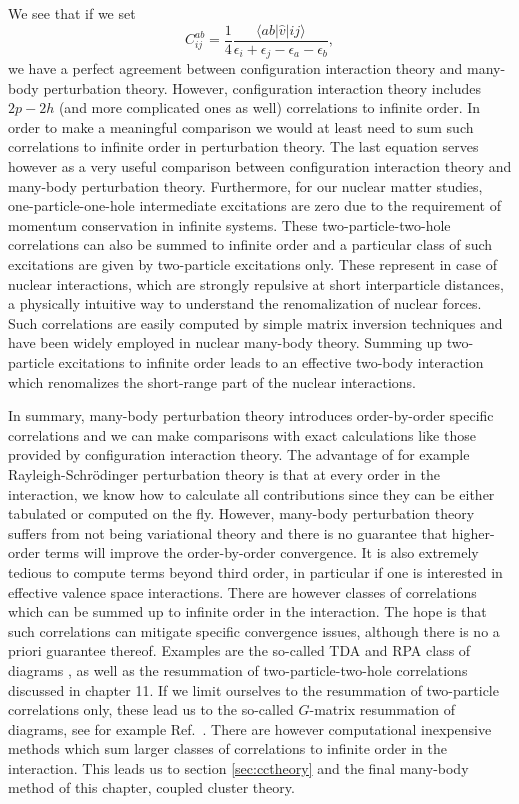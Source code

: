   We see that if we set
  \[
  C_{ij}^{ab} =\frac{1}{4}\frac{\langle ab \vert \hat{v} \vert ij
    \rangle}{\epsilon_i+\epsilon_j-\epsilon_a-\epsilon_b},
  \]
  we have a perfect agreement between configuration interaction  theory  and many-body perturbation
  theory. However, configuration interaction  theory includes $2p-2h$ (and more complicated ones as
  well) correlations to infinite order. In order to make a meaningful
  comparison we would at least need to sum such correlations to
  infinite order in perturbation theory. The last equation serves
  however as a very useful comparison between configuration interaction  theory and many-body
  perturbation theory. Furthermore, for our nuclear matter studies,
  one-particle-one-hole intermediate excitations are zero due to the
  requirement of momentum conservation in infinite systems. These
  two-particle-two-hole correlations can also be summed to infinite
  order and a particular class of such excitations are given by
  two-particle excitations only. These represent in case of nuclear interactions, which
  are strongly repulsive at short interparticle distances, a
  physically intuitive way to understand the renomalization of nuclear
  forces. Such correlations are easily computed by simple matrix
  inversion techniques and have been widely employed in nuclear
  many-body theory.  Summing up two-particle excitations to infinite
  order leads to an effective two-body interaction which renomalizes
  the short-range part of the nuclear interactions. 

In summary, many-body perturbation theory introduces order-by-order
specific correlations and we can make comparisons with exact
calculations like those provided by configuration interaction theory.
The advantage of for example Rayleigh-Schr\"odinger perturbation
theory is that at every order in the interaction, we know how to
calculate all contributions since they can be either tabulated or
computed on the fly.  However, many-body perturbation theory suffers
from not being variational theory and there is no guarantee that
higher-order terms will improve the order-by-order convergence.  It is
also extremely tedious to compute terms beyond third order, in
particular if one is interested in effective valence space
interactions.  There are however classes of correlations which can be
summed up to infinite order in the interaction.  The hope is that such
correlations can mitigate specific convergence issues, although there
is no a priori guarantee thereof.  Examples are the so-called TDA and
RPA class of diagrams \cite{ripkablaizot}, as well as the resummation
of two-particle-two-hole correlations discussed in chapter 11. If we limit ourselves to the
resummation of two-particle correlations only, these lead us to the
so-called $G$-matrix resummation of diagrams, see for example Ref.~\cite{day1967}.
There are however computational inexpensive methods which
sum larger classes of correlations to infinite order in the
interaction. This leads us to section \ref{sec:cctheory} and the final
many-body method of this chapter, coupled cluster theory. 


